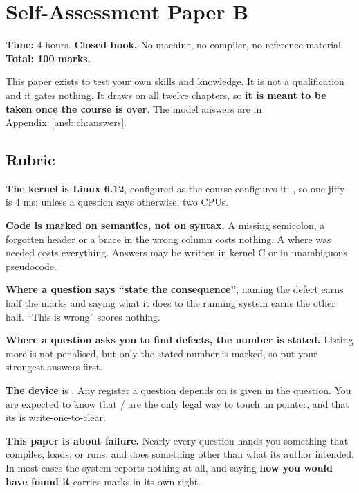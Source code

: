 
\chapter{Self-Assessment Paper B}
\label{exb:ch:paper}

\textbf{Time:} 4 hours. \textbf{Closed book.} No machine, no compiler, no reference material.
\textbf{Total: 100 marks.}

This paper exists to test your own skills and knowledge. It is not a qualification and it gates
nothing. It draws on all twelve chapters, so \textbf{it is meant to be taken once the course is
over}. The model answers are in Appendix~\ref{ansb:ch:answers}.

\section*{Rubric}

\textbf{The kernel is Linux 6.12}, configured as the course configures it: , so one
jiffy is 4 ms;  unless a question says otherwise; two CPUs.

\textbf{Code is marked on semantics, not on syntax.} A missing semicolon, a forgotten header or a
brace in the wrong column costs nothing. A  where  was needed costs
everything. Answers may be written in kernel C or in unambiguous pseudocode.

\textbf{Where a question says ``state the consequence''}, naming the defect earns half the marks and
saying what it does to the running system earns the other half. ``This is wrong'' scores nothing.

\textbf{Where a question asks you to find defects, the number is stated.} Listing more is not
penalised, but only the stated number is marked, so put your strongest answers first.

\textbf{The device} is . Any register a question depends on is given in the question.
You are expected to know that / are the only legal way to touch an
 pointer, and that its  is write-one-to-clear.

\textbf{This paper is about failure.} Nearly every question hands you something that compiles,
loads, or runs, and does something other than what its author intended. In most cases the system
reports nothing at all, and saying \textbf{how you would have found it} carries marks in its own
right.

